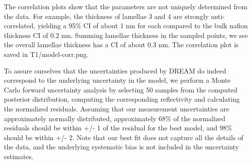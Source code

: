 \documentclass[letterpaper,10pt,english]{sphinxmanual}
\begin{document}

The correlation plots show that the parameters are not uniquely
determined from the data.  For example, the thickness of
lamellae 3 and 4 are strongly anti-correlated, yielding a 95\% CI of
about 1 nm for each compared to the bulk nafion thickness CI of 0.2 nm.
Summing lamellae thickness in the sampled points, we see the overall
lamellae thickness has a CI of about 0.3 nm.  The correlation
plot is saved in T1/model-corr.png.


To assure ourselves that the uncertainties produced by DREAM do
indeed correspond to the underlying uncertainty in the model, we perform
a Monte Carlo forward uncertainty analysis by selecting 50 samples from
the computed posterior distribution, computing the corresponding
reflectivity and calculating the normalized residuals.  Assuming that
our measurement uncertainties are approximately normally distributed,
approximately 68\% of the normalized residuals should be within +/- 1 of
the residual for the best model, and 98\% should be within +/- 2. Note
that our best fit does not capture all the details of the data, and the
underlying systematic bias is not included in the uncertainty estimates.
\end{document}

